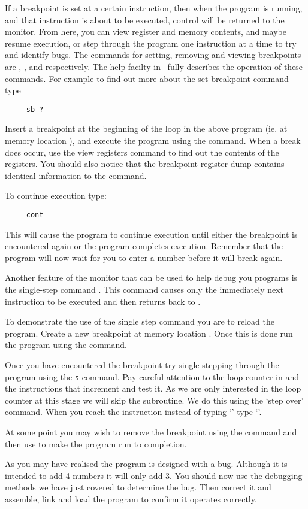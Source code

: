 If a breakpoint is set at a certain instruction, then when the program
is running, and that instruction is about to be executed, control will
be returned to the monitor. From here, you can view register and
memory contents, and maybe resume execution, or step through the
program one instruction at a time to try and identify bugs.  The
commands for setting, removing and viewing breakpoints are ,
, and  respectively. The help facilty in \WRAMPmon\
fully describes the operation of these commands. For example to find
out more about the set breakpoint command type
\begin{verbatim}
     sb ?
\end{verbatim}

Insert a breakpoint at the beginning of the loop in the above program 
(ie. at memory location \src{0x00004}), and
execute the program using the  command.
When a break does occur, use the view registers command to find out the 
contents of the registers. You should also notice that the breakpoint 
register dump contains identical information
to the  command.

To continue execution type:
\begin{verbatim}
     cont
\end{verbatim}
This will cause the program to continue execution until either the
breakpoint is encountered again or the program completes
execution. Remember that the program will now wait for you to enter a
number before it will break again.

Another feature of the monitor that can be used to help debug you programs 
is the single-step command \src{s}.
This command causes only the immediately next instruction 
to be executed and then returns back to
\WRAMPmon.

To demonstrate the use of the single step command you are to reload
the program.  Create a new breakpoint at memory location
. Once this is done run the program using the 
command.

Once you have encountered the breakpoint try single stepping through
the program using the \verb|s| command. Pay careful attention to the
loop counter in \reg{5} and the instructions that increment and test
it. As we are only interested in the loop counter at this stage we
will skip the \src{readnum} subroutine.  We do this using the `step
over'  command.  When you reach the instruction \src{jal
readnum} instead of typing `\src{s}' type `\src{so}'.

At some point you may wish to remove the breakpoint using the
 command and then use  to make the program run to
completion.

As you may have realised the program is designed with a bug.  Although
it is intended to add 4 numbers it will only add 3.  You should now use
the debugging methods we have just covered to determine the
bug.  Then correct it and assemble, link and load the program to confirm
it operates correctly.
